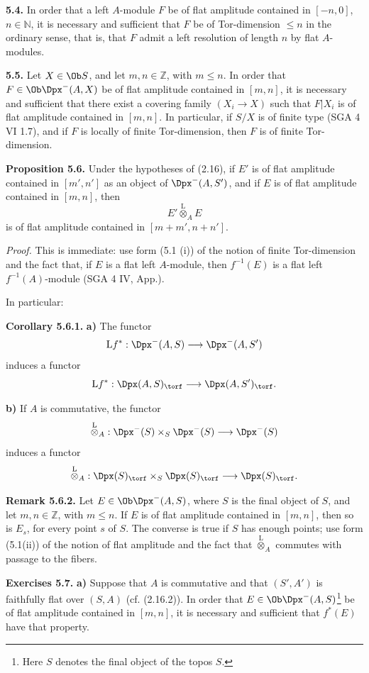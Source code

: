 \textbf{5.4.} In order that a left \(A\)-module \(F\) be of flat amplitude contained in \([-n,0]\), \(n\in\mathbb N\), it is necessary and sufficient that \(F\) be of Tor-dimension \(\leq n\) in the ordinary sense, that is, that \(F\) admit a left resolution of length \(n\) by flat \(A\)-modules.

\textbf{5.5.} Let \(X\in\Ob S\), and let \(m,n\in\mathbb Z\), with \(m\leq n\). In order that \(F\in\Ob\Dpx^-(A,X)\) be of flat amplitude contained in \([m,n]\), it is necessary and sufficient that there exist a covering family \((X_i\to X)\) such that \(F|X_i\) is of flat amplitude contained in \([m,n]\). In particular, if \(S/X\) is of finite type (SGA 4 VI 1.7), and if \(F\) is locally of finite Tor-dimension, then \(F\) is of finite Tor-dimension.

\textbf{Proposition 5.6.} Under the hypotheses of (2.16), if \(E'\) is of flat amplitude contained in \([m',n']\) as an object of \(\Dpx^-(A,S')\), and if \(E\) is of flat amplitude contained in \([m,n]\), then
\[
  E'\overset{\mathrm L}{\otimes}_A E
\]
is of flat amplitude contained in \([m+m',n+n']\).

\emph{Proof.} This is immediate: use form (5.1 (i)) of the notion of finite Tor-dimension and the fact that, if \(E\) is a flat left \(A\)-module, then \(f^{-1}(E)\) is a flat left \(f^{-1}(A)\)-module (SGA 4 IV, App.).

In particular:

\textbf{Corollary 5.6.1.} \textbf{a)} The functor
\[
  \mathrm L f^*:\Dpx^-(A,S)\longrightarrow \Dpx^-(A,S')
\]
induces a functor
\[
  \mathrm L f^*:\Dpx(A,S)_{\torf}\longrightarrow \Dpx(A,S')_{\torf}.
\]

\textbf{b)} If \(A\) is commutative, the functor
\[
  \overset{\mathrm L}{\otimes}_A:
  \Dpx^-(S)\times_S\Dpx^-(S)\longrightarrow \Dpx^-(S)
\]
induces a functor
\[
  \overset{\mathrm L}{\otimes}_A:
  \Dpx(S)_{\torf}\times_S\Dpx(S)_{\torf}
  \longrightarrow \Dpx(S)_{\torf}.
\]

\textbf{Remark 5.6.2.} Let \(E\in\Ob\Dpx^-(A,S)\), where \(S\) is the final object of \(S\), and let \(m,n\in\mathbb Z\), with \(m\leq n\). If \(E\) is of flat amplitude contained in \([m,n]\), then so is \(E_s\), for every point \(s\) of \(S\). The converse is true if \(S\) has enough points; use form (5.1(ii)) of the notion of flat amplitude and the fact that \(\overset{\mathrm L}{\otimes}_A\) commutes with passage to the fibers.

\textbf{Exercises 5.7.} \textbf{a)} Suppose that \(A\) is commutative and that \((S',A')\) is faithfully flat over \((S,A)\) (cf. (2.16.2)). In order that \(E\in\Ob\Dpx^-(A,S)\)\footnote{Here \(S\) denotes the final object of the topos \(S\).} be of flat amplitude contained in \([m,n]\), it is necessary and sufficient that \(f^*(E)\) have that property.

